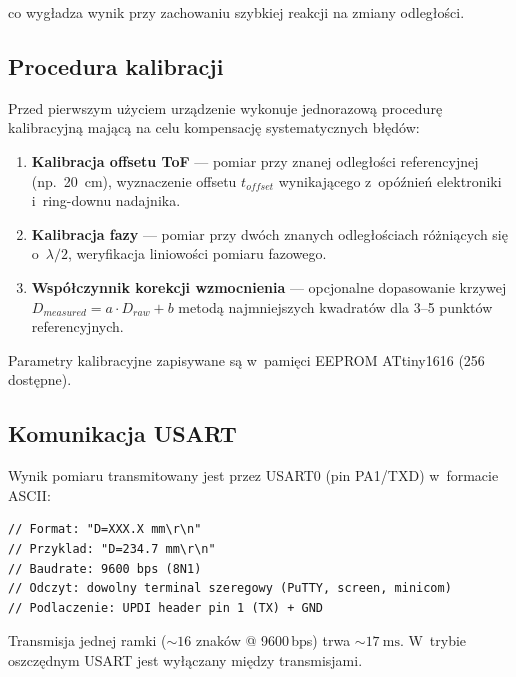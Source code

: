 \documentclass[a4paper,11pt]{article}
\begin{document}
co wygładza wynik przy zachowaniu szybkiej reakcji na zmiany odległości.

\subsection{Procedura kalibracji}
\label{sec:kalibracja}

Przed pierwszym użyciem urządzenie wykonuje jednorazową procedurę kalibracyjną
mającą na celu kompensację systematycznych błędów:

\begin{enumerate}[nosep]
    \item \textbf{Kalibracja offsetu ToF} --- pomiar przy znanej odległości
          referencyjnej (np.\ \SI{20}{\centi\metre}), wyznaczenie offsetu
          $t_{offset}$ wynikającego z~opóźnień elektroniki i~ring-downu nadajnika.
    \item \textbf{Kalibracja fazy} --- pomiar przy dwóch znanych odległościach
          różniących się o~$\lambda/2$, weryfikacja liniowości pomiaru fazowego.
    \item \textbf{Współczynnik korekcji wzmocnienia} --- opcjonalne dopasowanie
          krzywej $D_{measured} = a \cdot D_{raw} + b$ metodą najmniejszych
          kwadratów dla 3--5 punktów referencyjnych.
\end{enumerate}

Parametry kalibracyjne zapisywane są w~pamięci EEPROM ATtiny1616
(\SI{256}{\byte} dostępne).

\subsection{Komunikacja USART}
\label{sec:usart}

Wynik pomiaru transmitowany jest przez USART0 (pin PA1/TXD) w~formacie ASCII:

\begin{lstlisting}[caption={Format ramki wyjściowej USART}, label={lst:uart_frame}]
// Format: "D=XXX.X mm\r\n"
// Przyklad: "D=234.7 mm\r\n"
// Baudrate: 9600 bps (8N1)
// Odczyt: dowolny terminal szeregowy (PuTTY, screen, minicom)
// Podlaczenie: UPDI header pin 1 (TX) + GND
\end{lstlisting}

Transmisja jednej ramki (${\sim}16$ znaków @ 9600\,bps) trwa ${\sim}\SI{17}{\milli\second}$.
W~trybie oszczędnym USART jest wyłączany między transmisjami.


\end{document}
